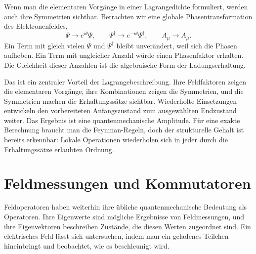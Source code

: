 Wenn man die elementaren Vorgänge in einer Lagrangedichte formuliert, werden auch ihre Symmetrien sichtbar. Betrachten wir eine globale Phasentransformation des Elektronenfeldes,
\begin{equation}
\Psi\longrightarrow e^{i\theta}\Psi,
\qquad
\Psi^\dagger\longrightarrow e^{-i\theta}\Psi^\dagger,
\qquad
A_\mu\longrightarrow A_\mu.
\end{equation}
Ein Term mit gleich vielen \(\Psi\) und \(\Psi^\dagger\) bleibt unverändert, weil sich die Phasen aufheben. Ein Term mit ungleicher Anzahl würde einen Phasenfaktor erhalten. Die Gleichheit dieser Anzahlen ist die algebraische Form der Ladungserhaltung.

Das ist ein zentraler Vorteil der Lagrangebeschreibung. Ihre Feldfaktoren zeigen die elementaren Vorgänge, ihre Kombinationen zeigen die Symmetrien, und die Symmetrien machen die Erhaltungssätze sichtbar. Wiederholte Einsetzungen entwickeln den vorbereiteten Anfangszustand zum ausgewählten Endzustand weiter. Das Ergebnis ist eine quantenmechanische Amplitude. Für eine exakte Berechnung braucht man die Feynman-Regeln, doch der strukturelle Gehalt ist bereits erkennbar: Lokale Operationen wiederholen sich in jeder durch die Erhaltungssätze erlaubten Ordnung.

\section{Feldmessungen und Kommutatoren}

Feldoperatoren haben weiterhin ihre übliche quantenmechanische Bedeutung als Operatoren. Ihre Eigenwerte sind mögliche Ergebnisse von Feldmessungen, und ihre Eigenvektoren beschreiben Zustände, die diesen Werten zugeordnet sind. Ein elektrisches Feld lässt sich untersuchen, indem man ein geladenes Teilchen hineinbringt und beobachtet, wie es beschleunigt wird.

\begin{classroomqa}
\end{classroomqa}

